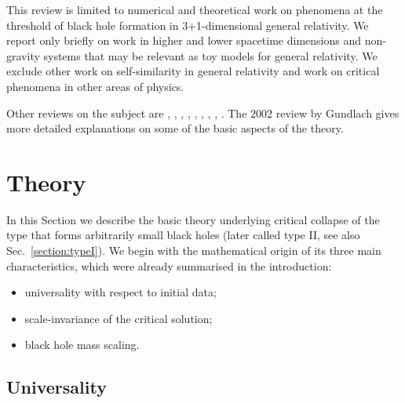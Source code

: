 \documentclass{article}
\begin{document}
This review is limited to numerical and theoretical work on phenomena
at the threshold of black hole formation in 3+1-dimensional general
relativity. We report only briefly on work in higher and lower
spacetime dimensions and non-gravity systems that may be relevant as
toy models for general relativity. We exclude other work on 
self-similarity in general relativity and work on critical phenomena
in other areas of physics.

Other reviews on the subject are 
\cite{Horne_MOG},
\cite{Bizon},
\cite{Gundlach_Banach},
\cite{Gundlach_critreview1},
\cite{Choptuik_review},
\cite{Choptuik_review2},
\cite{BradyCai},
\cite{Gundlach_critreview2},
\cite{MartinGundlach2}.
The 2002 review \cite{gundlach_critreview3} by Gundlach gives
more detailed explanations on some of the basic aspects of the theory.


\section{Theory}
\label{section:theory}

In this Section we describe the basic theory underlying critical
collapse of the type that forms arbitrarily small black holes (later
called type II, see also Sec.~\ref{section:typeI}). We begin with the
mathematical origin of its three main characteristics, which were
already summarised in the introduction:

\begin{itemize}

\item universality with respect to initial data;

\item scale-invariance of the critical solution;

\item black hole mass scaling.

\end{itemize}


\subsection{Universality}
\label{section:universality}
\end{document}
